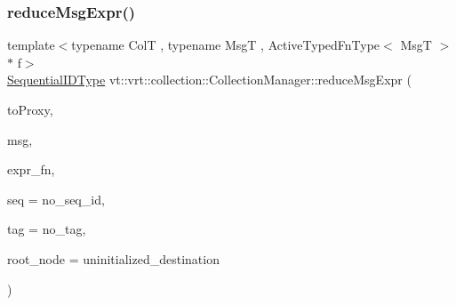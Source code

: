 \subsubsection{\texorpdfstring{reduce\+Msg\+Expr()}{reduceMsgExpr()}\hspace{0.1cm}{\footnotesize\ttfamily [1/2]}}
{\footnotesize\ttfamily template$<$typename ColT , typename MsgT , Active\+Typed\+Fn\+Type$<$ Msg\+T $>$ $\ast$ f$>$ \\
\hyperlink{namespacevt_a3063d4db3b879d6dd2c7b8d50995c7f6}{Sequential\+I\+D\+Type} vt\+::vrt\+::collection\+::\+Collection\+Manager\+::reduce\+Msg\+Expr (\begin{DoxyParamCaption}\item[{\hyperlink{structvt_1_1vrt_1_1collection_1_1_collection_manager_a56458ed7f9bb22b631b9b3a745f42f94}{Collection\+Proxy\+Wrap\+Type}$<$ ColT, typename Col\+T\+::\+Index\+Type $>$ const \&}]{to\+Proxy,  }\item[{MsgT $\ast$const}]{msg,  }\item[{\hyperlink{structvt_1_1vrt_1_1collection_1_1_collection_manager_a47a3227ae0195c15187e8dc8762f66c4}{Reduce\+Idx\+Func\+Type}$<$ typename Col\+T\+::\+Index\+Type $>$}]{expr\+\_\+fn,  }\item[{\hyperlink{namespacevt_a3063d4db3b879d6dd2c7b8d50995c7f6}{Sequential\+I\+D\+Type}}]{seq = {\ttfamily no\+\_\+seq\+\_\+id},  }\item[{\hyperlink{namespacevt_a84ab281dae04a52a4b243d6bf62d0e52}{Tag\+Type}}]{tag = {\ttfamily no\+\_\+tag},  }\item[{\hyperlink{namespacevt_a866da9d0efc19c0a1ce79e9e492f47e2}{Node\+Type}}]{root\+\_\+node = {\ttfamily uninitialized\+\_\+destination} }\end{DoxyParamCaption})}

\mbox{\label{structvt_1_1vrt_1_1collection_1_1_collection_manager_a10a8bcd896b8d2ccdc27c03302ea2001}} 
